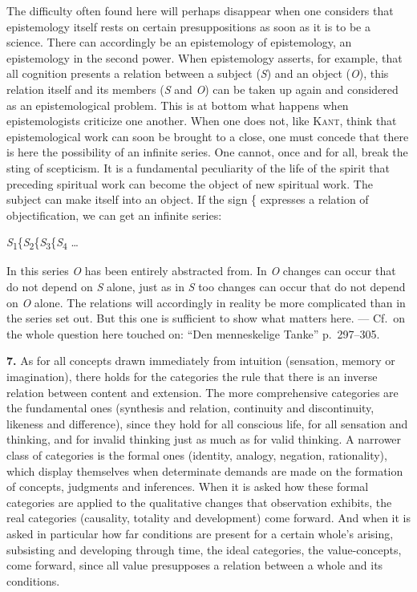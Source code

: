 \documentclass[12pt]{book}
\newcommand{\hnum}[1]{\textbf{#1.}\enspace}
\newcommand{\opage}[1]{\marginnote{\footnotesize\textit{[#1]}}}
\begin{document}
The difficulty often found here will perhaps disappear when one considers that
epistemology itself rests on certain presuppositions as soon as it is to be a
science. There can accordingly be an epistemology of epistemology, an
epistemology in the second power. When epistemology asserts, for example, that
all cognition presents a relation between a subject (\textit{S}) and an object
(\textit{O}), this relation itself and its members (\textit{S} and \textit{O})
can be taken up again and considered as an epistemological problem. This is at
bottom what happens when epistemologists criticize one another. When one does
not, like \textsc{Kant}, think that epistemological work can soon be brought to
a close, one must concede that there is here the possibility of an infinite
series. One cannot, once and for all, break the sting of scepticism. It is a
fundamental peculiarity of the life of the spirit that preceding spiritual work
can become the object of new spiritual work. The subject can make itself into an
object. If the sign \{ expresses a relation of objectification, we can get an
infinite series:

\begin{center}
\textit{S}\textsubscript{1}\{\textit{S}\textsubscript{2}\{\textit{S}\textsubscript{3}\{\textit{S}\textsubscript{4} \dots
\end{center}

In this series \textit{O} has been entirely abstracted from. In \textit{O}
changes can occur that do not depend on \textit{S} alone, just as in \textit{S}
too changes can occur that do not depend on \textit{O} alone. The relations will
accordingly in reality be more complicated than in the series set out. But this
one is sufficient to show what matters here. --- Cf.\ on the whole question here
touched on: ``Den menneskelige Tanke'' p.\ 297--305.

\hnum{7} As for all concepts drawn immediately from intuition (sensation, memory
or imagination), there holds for the categories the rule that there is an
inverse relation between content and extension. The more comprehensive
categories are the fundamental ones (synthesis and relation, continuity and
discontinuity, likeness and difference), since they hold for all conscious life,
for all sensation and thinking, and for invalid thinking just as much as for
valid thinking. A narrower class of categories is the formal ones (identity,
analogy, negation, rationality), which display themselves when determinate
demands are made on the formation of concepts, judgments and inferences. When it
is asked how these formal categories are applied to the qualitative changes that
observation exhibits, the real categories \opage{19}(causality, totality and development)
come forward. And when it is asked in particular how far conditions are present
for a certain whole's arising, subsisting and developing through time, the ideal
categories, the value-concepts, come forward, since all value presupposes a
relation between a whole and its conditions.
\end{document}
